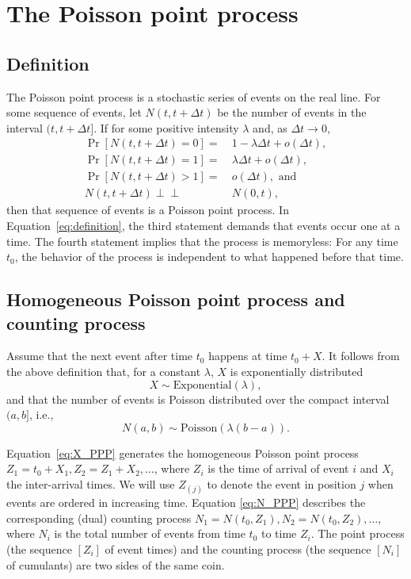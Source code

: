 \documentclass[article,nojss]{jss}\usepackage[]{graphicx}\usepackage[]{xcolor}
\newcommand{\indep}{\perp \!\!\! \perp}
\begin{document}
\section{The Poisson point process} \label{sec:review}
\subsection{Definition}
The Poisson point process is a stochastic series of events on the real line. For some sequence of events, let $N(t, t + \Delta t)$ be the number of events in the interval $(t, t  + \Delta t]$. If for some positive intensity $\lambda$ and, as ${\Delta t \rightarrow 0}$,
\begin{equation}\label{eq:definition}
    \begin{aligned}
    \Pr[N(t, t + \Delta t) = 0] =&\  1 - \lambda \Delta t +  o(\Delta t), \\
    \Pr[N(t, t + \Delta t) = 1] =&\  \lambda \Delta t +  o(\Delta t), \\
    \Pr[N(t, t + \Delta t) >1] =&\  o(\Delta t),\text{ and } \\
    N(t, t + \Delta t) \indep&\ N(0, t),
    \end{aligned}
\end{equation}
then that sequence of events is a Poisson point process. In Equation~\eqref{eq:definition}, the third statement demands that events occur one at a time. The fourth statement implies that the process is memoryless: For any time $t_0$, the behavior of the process is independent to what happened before that time.

\subsection{Homogeneous Poisson point process and counting process}\label{sec:ppp-intro}
Assume that the next event after time $t_0$ happens at time $t_0 + X$. It follows from the above definition \citep[par. 4.1]{cox1965theory} that, for a constant $\lambda$, $X$ is exponentially distributed
\begin{equation}\label{eq:X_PPP}
X \sim \text{Exponential}(\lambda),
\end{equation}
and that the number of events is Poisson distributed over the compact interval $(a, b]$, i.e.,
\begin{equation}\label{eq:N_PPP}
N(a, b) \sim \text{Poisson}(\lambda (b-a)).
\end{equation}

Equation~\eqref{eq:X_PPP} generates the homogeneous Poisson point process ${Z_1 = t_0 + X_1, Z_2 = Z_1 + X_2, \dots}$, where $Z_i$ is the time of arrival of event $i$ and $X_i$ the inter-arrival times. We will use $Z_{(j)}$ to denote the event in position $j$ when events are ordered in increasing time.
%
Equation \eqref{eq:N_PPP} describes the corresponding (dual) counting process
${N_1 = N(t_0, Z_1)}, {N_2 = N(t_0, Z_2), \dots}$, where $N_i$ is the total number of events from time $t_0$ to time $Z_i$. The point process (the sequence $[Z_i]$ of event times) and the counting process (the sequence $[N_i]$ of cumulants) are two sides of the same coin.
\end{document}
